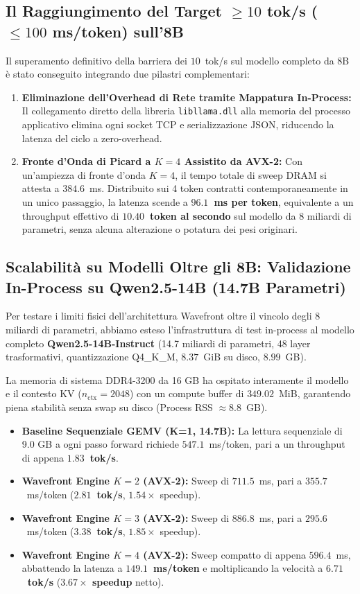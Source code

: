 \documentclass[10pt,a4paper]{article}
\theoremstyle{definition}
\begin{document}
\subsection{Il Raggiungimento del Target $\ge 10$ tok/s ($\le 100$ ms/token) sull'8B}
Il superamento definitivo della barriera dei $10$~tok/s sul modello completo da 8B è stato conseguito integrando due pilastri complementari:
\begin{enumerate}
    \item \textbf{Eliminazione dell'Overhead di Rete tramite Mappatura In-Process:} Il collegamento diretto della libreria \texttt{libllama.dll} alla memoria del processo applicativo elimina ogni socket TCP e serializzazione JSON, riducendo la latenza del ciclo a zero-overhead.
    \item \textbf{Fronte d'Onda di Picard a $K=4$ Assistito da AVX-2:} Con un'ampiezza di fronte d'onda $K=4$, il tempo totale di sweep DRAM si attesta a $384.6$~ms. Distribuito sui 4 token contratti contemporaneamente in un unico passaggio, la latenza scende a \textbf{$96.1$~ms per token}, equivalente a un throughput effettivo di \textbf{$10.40$~token al secondo} sul modello da 8 miliardi di parametri, senza alcuna alterazione o potatura dei pesi originari.
\end{enumerate}

\subsection{Scalabilità su Modelli Oltre gli 8B: Validazione In-Process su Qwen2.5-14B (14.7B Parametri)}
Per testare i limiti fisici dell'architettura Wavefront oltre il vincolo degli 8 miliardi di parametri, abbiamo esteso l'infrastruttura di test in-process al modello completo \textbf{Qwen2.5-14B-Instruct} (14.7 miliardi di parametri, 48 layer trasformativi, quantizzazione Q4\_K\_M, $8.37$~GiB su disco, $8.99$~GB).

La memoria di sistema DDR4-3200 da 16 GB ha ospitato interamente il modello e il contesto KV ($n_{\text{ctx}} = 2048$) con un compute buffer di $349.02$~MiB, garantendo piena stabilità senza swap su disco (Process RSS $\approx 8.8$~GB).

\begin{itemize}[leftmargin=1.5em]
    \item \textbf{Baseline Sequenziale GEMV (K=1, 14.7B):} La lettura sequenziale di 9.0 GB a ogni passo forward richiede $547.1$~ms/token, pari a un throughput di appena \textbf{$1.83$~tok/s}.
    \item \textbf{Wavefront Engine $K=2$ (AVX-2):} Sweep di $711.5$~ms, pari a $355.7$~ms/token (\textbf{$2.81$~tok/s}, $1.54\times$ speedup).
    \item \textbf{Wavefront Engine $K=3$ (AVX-2):} Sweep di $886.8$~ms, pari a $295.6$~ms/token (\textbf{$3.38$~tok/s}, $1.85\times$ speedup).
    \item \textbf{Wavefront Engine $K=4$ (AVX-2):} Sweep compatto di appena $596.4$~ms, abbattendo la latenza a \textbf{$149.1$~ms/token} e moltiplicando la velocità a \textbf{$6.71$~tok/s} (\textbf{$3.67\times$ speedup} netto).
\end{itemize}
\end{document}
